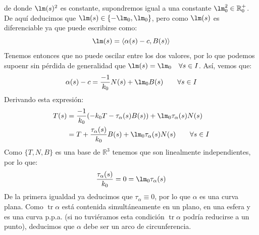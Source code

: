 \documentclass[12pt]{article}
\DeclareMathOperator{\tr}{tr}
\begin{document}
\begin{ejercicio}[3 puntos]
\begin{description}
                de donde $\lm(s)^2$ es constante, supondremos igual a una constante $\lm_0^2\in \mathbb{R}^+_0$. De aquí deducimos que $\lm(s) \in \{-\lm_0,\lm_0\}$, pero como $\lm(s)$ es diferenciable ya que puede escribirse como:
                \begin{equation*}
                    \lm(s) = \langle \alpha(s)-c,B(s) \rangle 
                \end{equation*}
                Tenemos entonces que no puede oscilar entre los dos valores, por lo que podemos supoenr sin pérdida de generalidad que $\lm(s) = \lm_0\quad \forall s\in I$. Así, vemos que:
                \begin{equation*}
                    \alpha(s) -c = \frac{-1}{k_0}N(s) + \lm_0 B(s)\qquad \forall s\in I
                \end{equation*}
                Derivando esta expresión:
                \begin{align*}
                    T(s) &= \frac{-1}{k_0}(-k_0T-\tau_\alpha(s)B(s)) + \lm_0\tau_\alpha(s)N(s)  \\
                         &= T + \frac{\tau_\alpha(s)}{k_0}B(s) + \lm_0\tau_\alpha(s)N(s) \qquad \forall s\in I
                \end{align*}
                Como $\{T,N,B\}$ es una base de $\mathbb{R}^3$ tenemos que son linealmente independientes, por lo que:
                \begin{equation*}
                    \frac{\tau_\alpha(s)}{k_0} = 0 = \lm_0\tau_\alpha(s)
                \end{equation*}
                De la primera igualdad ya deducimos que $\tau_\alpha\equiv 0$, por lo que $\alpha$ es una curva plana. Como $\tr\alpha$ está contenida simultáneamente en un plano, en una esfera y es una curva p.p.a. (si no tuviéramos esta condición $\tr\alpha$ podría reducirse a un punto), deducimos que $\alpha$ debe ser un arco de circunferencia.
        \end{description}
    \end{ejercicio}
\end{document}
